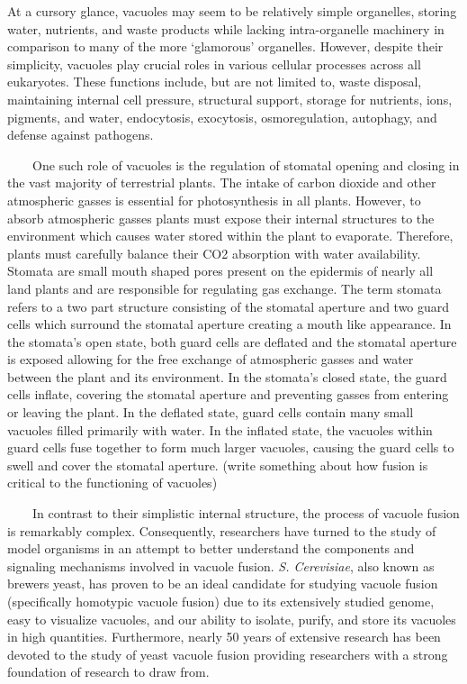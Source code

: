 \documentclass[12pt,twoside]{reedthesis}
\begin{document}
At a cursory glance, vacuoles may seem to be relatively simple organelles, storing water, nutrients, and waste products while lacking intra-organelle machinery in comparison to many of the more `glamorous' organelles. However, despite their simplicity, vacuoles play crucial roles in various cellular processes across all eukaryotes. These functions include, but are not limited to, waste disposal, maintaining internal cell pressure, structural support, storage for nutrients, ions, pigments, and water, endocytosis, exocytosis, osmoregulation, autophagy, and defense against pathogens.\\
\strut ~~~~One such role of vacuoles is the regulation of stomatal opening and closing in the vast majority of terrestrial plants. The intake of carbon dioxide and other atmospheric gasses is essential for photosynthesis in all plants. However, to absorb atmospheric gasses plants must expose their internal structures to the environment which causes water stored within the plant to evaporate. Therefore, plants must carefully balance their CO2 absorption with water availability. Stomata are small mouth shaped pores present on the epidermis of nearly all land plants and are responsible for regulating gas exchange. The term stomata refers to a two part structure consisting of the stomatal aperture and two guard cells which surround the stomatal aperture creating a mouth like appearance. In the stomata's open state, both guard cells are deflated and the stomatal aperture is exposed allowing for the free exchange of atmospheric gasses and water between the plant and its environment. In the stomata's closed state, the guard cells inflate, covering the stomatal aperture and preventing gasses from entering or leaving the plant. In the deflated state, guard cells contain many small vacuoles filled primarily with water. In the inflated state, the vacuoles within guard cells fuse together to form much larger vacuoles, causing the guard cells to swell and cover the stomatal aperture. (write something about how fusion is critical to the functioning of vacuoles)\\
\strut ~~~~In contrast to their simplistic internal structure, the process of vacuole fusion is remarkably complex. Consequently, researchers have turned to the study of model organisms in an attempt to better understand the components and signaling mechanisms involved in vacuole fusion. \emph{S. Cerevisiae}, also known as brewers yeast, has proven to be an ideal candidate for studying vacuole fusion (specifically homotypic vacuole fusion) due to its extensively studied genome, easy to visualize vacuoles, and our ability to isolate, purify, and store its vacuoles in high quantities. Furthermore, nearly 50 years of extensive research has been devoted to the study of yeast vacuole fusion providing researchers with a strong foundation of research to draw from.
\end{document}
